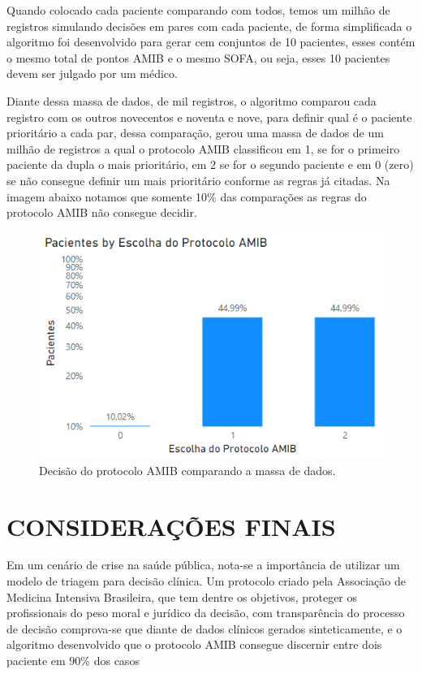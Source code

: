 \documentclass[12pt]{article}
\begin{document}
Quando colocado cada paciente comparando com todos, temos um milhão de registros simulando decisões em pares com cada paciente, de forma simplificada o algoritmo foi desenvolvido para gerar cem conjuntos de 10 pacientes, esses contém o mesmo total de pontos AMIB e o mesmo SOFA, ou seja, esses 10 pacientes devem ser julgado por um médico. 

Diante dessa massa de dados, de mil registros, o algoritmo comparou cada registro com os outros novecentos e noventa e nove, para definir qual é o paciente prioritário a cada par, dessa comparação, gerou uma massa de dados de um milhão de registros a qual o protocolo AMIB classificou em 1, se for o primeiro paciente da dupla o mais prioritário, em 2 se for o segundo paciente e em 0 (zero) se não consegue definir um mais prioritário conforme as regras já citadas.
Na imagem abaixo notamos que somente 10\% das comparações as regras do protocolo AMIB não consegue decidir.

\begin{figure}[!htb]
    \centering
    \includegraphics[scale=0.9]{img/comparação.png}
    \centering
    \caption{Decisão do protocolo AMIB comparando a massa de dados. }
    \label{Decisão-de-pacientes-1-2-0}
\end{figure}



\clearpage

\section{CONSIDERAÇÕES FINAIS}

Em um cenário de crise na saúde pública, nota-se a importância de utilizar um modelo de triagem para decisão clínica. Um protocolo criado pela Associação de Medicina Intensiva Brasileira, que tem dentre os objetivos, proteger os profissionais do peso moral e jurídico da decisão, com transparência do processo de decisão comprova-se que diante de dados clínicos gerados sinteticamente, e o algoritmo desenvolvido que o protocolo AMIB consegue discernir entre dois paciente em 90\% dos casos
\end{document}
